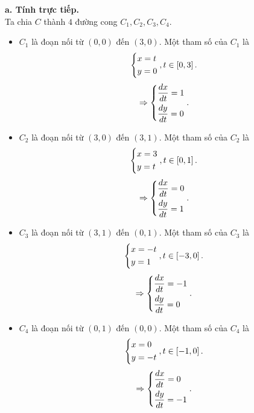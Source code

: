 \documentclass[12pt,a4paper]{article}
\begin{document}
\textbf{a. Tính trực tiếp.}\\
Ta chia \(C\) thành \(4\) đường cong \(C_1, C_2, C_3, C_4.\)
\begin{itemize}
\item \(C_1\) là đoạn nối từ \(\left( {0,0} \right)\) đến \(\left( {3,0} \right).\) Một tham số của \(C_1\) là
\[\left\{ \begin{gathered}
  x = t \hfill \\
  y = 0 \hfill \\ 
\end{gathered}  \right.,t \in \left[ {0,3} \right].\]
\[ \Rightarrow \left\{ \begin{gathered}
  \frac{{dx}}{{dt}} = 1 \hfill \\
  \frac{{dy}}{{dt}} = 0 \hfill \\ 
\end{gathered}  \right..\]
\item \(C_2\) là đoạn nối từ \(\left( {3,0} \right)\) đến \(\left( {3,1} \right).\) Một tham số của \(C_2\) là
\[\left\{ \begin{gathered}
  x = 3 \hfill \\
  y = t \hfill \\ 
\end{gathered}  \right.,t \in \left[ {0,1} \right].\]
\[ \Rightarrow \left\{ \begin{gathered}
  \frac{{dx}}{{dt}} = 0 \hfill \\
  \frac{{dy}}{{dt}} = 1 \hfill \\ 
\end{gathered}  \right..\]
\item \(C_3\) là đoạn nối từ \(\left( {3,1} \right)\) đến \(\left( {0,1} \right).\) Một tham số của \(C_3\) là
\[\left\{ \begin{gathered}
  x =  - t \hfill \\
  y = 1 \hfill \\ 
\end{gathered}  \right.,t \in \left[ { - 3,0} \right].\]
\[ \Rightarrow \left\{ \begin{gathered}
  \frac{{dx}}{{dt}} =  - 1 \hfill \\
  \frac{{dy}}{{dt}} = 0 \hfill \\ 
\end{gathered}  \right..\]
\item \(C_4\) là đoạn nối từ \(\left( {0,1} \right)\) đến \(\left( {0,0} \right).\) Một tham số của \(C_4\) là
\[\left\{ \begin{gathered}
  x = 0 \hfill \\
  y =  - t \hfill \\ 
\end{gathered}  \right.,t \in \left[ { - 1,0} \right].\]
\[ \Rightarrow \left\{ \begin{gathered}
  \frac{{dx}}{{dt}} = 0 \hfill \\
  \frac{{dy}}{{dt}} =  - 1 \hfill \\ 
\end{gathered}  \right..\]
\end{itemize}
\end{document}
